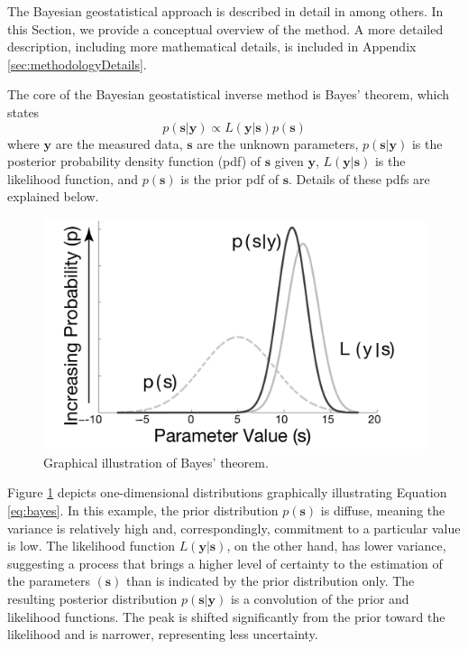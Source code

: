 \documentclass[11pt,oneside,onecolumn]{usgsreport}
\begin{document}
\begin{multicols}{2}
\begin{bibunit}

The Bayesian geostatistical approach is described in detail in \citet{KitanidisVomvoris1983,HoeksemaKitanidis1984a,Kitanidis1995,NowakCirpka2004}
among others. In this Section, we provide a conceptual overview of
the method. A more detailed description, including more mathematical
details, is included in Appendix \ref{sec:methodologyDetails}.

The core of the Bayesian geostatistical inverse method is Bayes' theorem,
which states
\begin{equation}
p(\mathbf{s|y})\propto L(\mathbf{y|s})p(\mathbf{s})\label{eq:bayes}
\end{equation}
 where \textbf{$\mathbf{y}$} are the measured data, $\mathbf{s}$
are the unknown parameters, $p(\mathbf{s|y})$ is the posterior probability
density function (pdf) of $\mathbf{s}$ given $\mathbf{y}$, $L(\mathbf{y|s})$
is the likelihood function, and $p(\mathbf{s})$ is the prior pdf
of $\mathbf{s}$. Details of these pdfs are explained below. 

\begin{figure}[!t]
\begin{centering}
\includegraphics[scale=0.55]{figures/normals}
\par\end{centering}

\caption{\label{fig:normals}Graphical illustration of Bayes' theorem.}
\end{figure}


Figure \ref{fig:normals} depicts one-dimensional distributions graphically
illustrating Equation \ref{eq:bayes}. In this example, the prior
distribution $p\left(\mathbf{s}\right)$ is diffuse, meaning the variance
is relatively high and, correspondingly, commitment to a particular
value is low. The likelihood function $L\left(\mathbf{y|s}\right)$,
on the other hand, has lower variance, suggesting a process that brings
a higher level of certainty to the estimation of the parameters $\left(\mathbf{s}\right)$
than is indicated by the prior distribution only. The resulting posterior
distribution $p\left(\mathbf{s|y}\right)$ is a convolution of the
prior and likelihood functions. The peak is shifted significantly
from the prior toward the likelihood and is narrower, representing
less uncertainty.


\end{bibunit}
\end{multicols}
\end{document}
